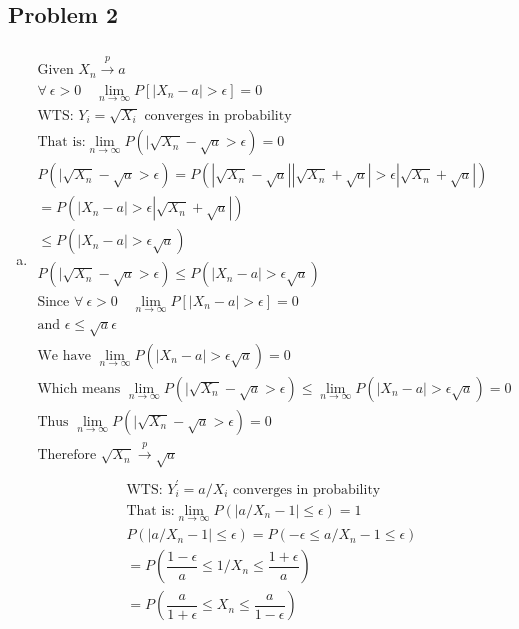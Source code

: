 \documentclass{article}
\begin{document}
\begin{flushleft}
	\section*{Problem 2}
\begin{enumerate}[(a)]
	
	\item 
\begin{multline*}\\
\text{Given } X_n \overset{p}{\to} a\\
\forall \ \epsilon>0 \quad \lim_{n\to \infty} P[|X_n-a|> \epsilon]=0\\
\text{WTS: } Y_i=\sqrt{X_i} \text{ converges in probability}\\
\text{That is:} \lim_{n\to \infty}P(|\sqrt{X_n}-\sqrt{a}>\epsilon)=0\\
P(|\sqrt{X_n}-\sqrt{a}>\epsilon)
=P(|\sqrt{X_n}-\sqrt{a}||\sqrt{X_n}+\sqrt{a}|>\epsilon|\sqrt{X_n}+\sqrt{a}|)\\
=P(|X_n-a|> \epsilon|\sqrt{X_n}+\sqrt{a}|)\\
\leq P(|X_n-a|> \epsilon\sqrt{a})\\
P(|\sqrt{X_n}-\sqrt{a}>\epsilon)\leq P(|X_n-a|> \epsilon\sqrt{a})\\
\text{Since } \forall \ \epsilon>0 \quad \lim_{n\to \infty} P[|X_n-a|> \epsilon]=0\\
\text{and } \epsilon\leq \sqrt{a}\epsilon\\
\text{We have }\lim_{n \to \infty}P(|X_n-a|> \epsilon\sqrt{a})=0\\
\text{Which means }\lim_{n\to \infty} P(|\sqrt{X_n}-\sqrt{a}>\epsilon)\leq\lim_{n \to \infty}P(|X_n-a|> \epsilon\sqrt{a})=0\\
\text{Thus }\lim_{n\to \infty} P(|\sqrt{X_n}-\sqrt{a}>\epsilon)= 0\\
\text{Therefore } \sqrt{X_n} \overset{p}{\to} \sqrt{a}\\
\end{multline*}
\begin{multline*}
\text{WTS: } Y_i^{'}=a/X_i \text{ converges in probability}\\
\text{That is:} \lim_{n\to \infty}P(|a/X_n-1|\leq\epsilon)=1\\
P(|a/X_n-1|\leq\epsilon)=P(-\epsilon\leq a/X_n-1\leq \epsilon)\\
=P\left(\dfrac{1-\epsilon}{a}\leq 1/X_n\leq \dfrac{1+\epsilon}{a}\right)\\
=P\left(\dfrac{a}{1+\epsilon}\leq X_n\leq \dfrac{a}{1-\epsilon}\right)\\

\end{multline*}
\end{enumerate}
\end{flushleft}
\end{document}
